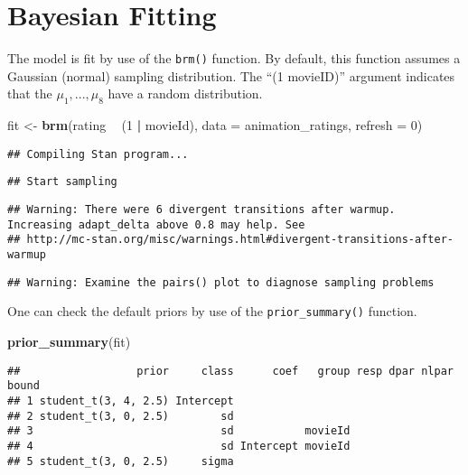 \documentclass[
]{book}
\newenvironment{Shaded}{\begin{snugshade}}{\end{snugshade}}
\newcommand{\DataTypeTok}[1]{\textcolor[rgb]{0.13,0.29,0.53}{#1}}
\newcommand{\DecValTok}[1]{\textcolor[rgb]{0.00,0.00,0.81}{#1}}
\newcommand{\KeywordTok}[1]{\textcolor[rgb]{0.13,0.29,0.53}{\textbf{#1}}}
\newcommand{\NormalTok}[1]{#1}
\newcommand{\OperatorTok}[1]{\textcolor[rgb]{0.81,0.36,0.00}{\textbf{#1}}}
\newcommand{\StringTok}[1]{\textcolor[rgb]{0.31,0.60,0.02}{#1}}
\begin{document}
\hypertarget{bayesian-fitting}{%
\section{Bayesian Fitting}\label{bayesian-fitting}}

The model is fit by use of the \texttt{brm()} function. By default, this function assumes a Gaussian (normal) sampling distribution. The ``(1 \textbar{} movieID)'' argument indicates that the \(\mu_1, ..., \mu_8\) have a random distribution.

\begin{Shaded}
\begin{Highlighting}[]
\NormalTok{fit <-}\StringTok{ }\KeywordTok{brm}\NormalTok{(rating }\OperatorTok{~}\StringTok{ }\NormalTok{(}\DecValTok{1} \OperatorTok{|}\StringTok{ }\NormalTok{movieId),}
           \DataTypeTok{data =}\NormalTok{ animation_ratings,}
           \DataTypeTok{refresh =} \DecValTok{0}\NormalTok{)}
\end{Highlighting}
\end{Shaded}

\begin{verbatim}
## Compiling Stan program...
\end{verbatim}

\begin{verbatim}
## Start sampling
\end{verbatim}

\begin{verbatim}
## Warning: There were 6 divergent transitions after warmup. Increasing adapt_delta above 0.8 may help. See
## http://mc-stan.org/misc/warnings.html#divergent-transitions-after-warmup
\end{verbatim}

\begin{verbatim}
## Warning: Examine the pairs() plot to diagnose sampling problems
\end{verbatim}

One can check the default priors by use of the \texttt{prior\_summary()} function.

\begin{Shaded}
\begin{Highlighting}[]
\KeywordTok{prior_summary}\NormalTok{(fit)}
\end{Highlighting}
\end{Shaded}

\begin{verbatim}
##                  prior     class      coef   group resp dpar nlpar bound
## 1 student_t(3, 4, 2.5) Intercept                                        
## 2 student_t(3, 0, 2.5)        sd                                        
## 3                             sd           movieId                      
## 4                             sd Intercept movieId                      
## 5 student_t(3, 0, 2.5)     sigma
\end{verbatim}
\end{document}
